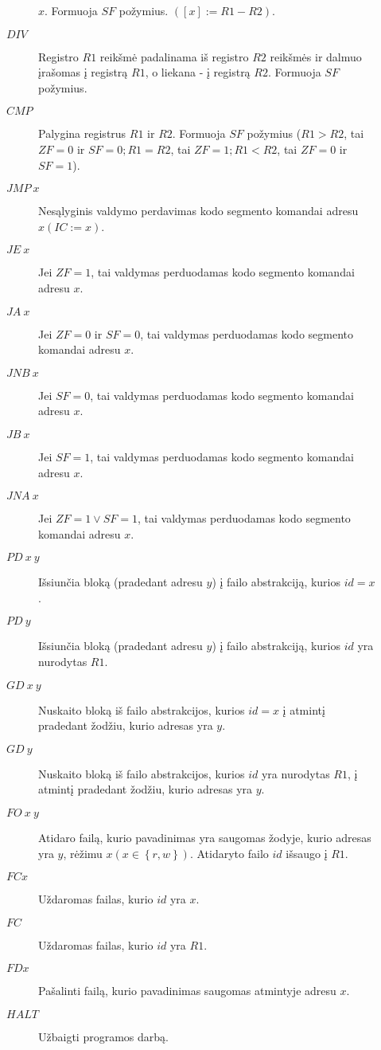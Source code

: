 \begin{description}
\begin{description}
          $x$. Formuoja $SF$ požymius. 
          $([x]:=R1-R2)$.
        \item[$DIV$] Registro $R1$ reikšmė padalinama iš registro $R2$ 
          reikšmės ir dalmuo įrašomas į registrą $R1$, o liekana - į 
          registrą $R2$. Formuoja $SF$ požymius.
        \item[$CMP$] Palygina registrus $R1$ ir $R2$. Formuoja $SF$ požymius
          ($R1>R2$, tai $ZF=0$ ir $SF=0; R1=R2$, tai $ZF=1; R1<R2$, 
          tai $ZF=0$ ir $SF=1$).
        \item[$JMP \: x$] Nesąlyginis valdymo perdavimas kodo segmento 
          komandai adresu  $x (IC:=x)$.
        \item[$JE \: x$] Jei $ZF=1$, tai valdymas perduodamas kodo segmento 
          komandai adresu $x$.
        \item[$JA \: x$] Jei $ZF=0$ ir $SF=0$, tai valdymas perduodamas kodo
          segmento komandai adresu $x$.
        \item[$JNB \: x$] Jei $SF=0$, tai valdymas perduodamas 
          kodo segmento komandai adresu $x$.
        \item[$JB \: x$] Jei $SF=1$, tai valdymas perduodamas kodo segmento
          komandai adresu $x$.
        \item[$JNA \: x$] Jei $ZF = 1 \lor SF=1$, tai valdymas perduodamas 
          kodo segmento komandai adresu $x$.
        \item[$PD \: x \: y$] Išsiunčia bloką (pradedant adresu 
          $y$) į failo abstrakciją, kurios $id = x$.
        \item[$PD \: y$] Išsiunčia bloką (pradedant adresu 
          $y$) į failo abstrakciją, kurios $id$ yra nurodytas $R1$.
        \item[$GD \: x \: y$] Nuskaito bloką iš failo abstrakcijos, kurios
          $id = x$ į atmintį pradedant žodžiu, kurio adresas yra $y$.
        \item[$GD \: y$] Nuskaito bloką iš failo abstrakcijos, kurios
          $id$ yra nurodytas $R1$, į atmintį pradedant žodžiu, kurio 
          adresas yra $y$.
        \item[$FO \: x \: y$] Atidaro failą, kurio pavadinimas yra saugomas
          žodyje, kurio adresas yra $y$, rėžimu 
          $x (x \in \left\{ r, w \right\})$. Atidaryto failo $id$ 
          išsaugo į $R1$.
        \item[$FC x$] Uždaromas failas, kurio $id$ yra $x$.
        \item[$FC$] Uždaromas failas, kurio $id$ yra $R1$.
        \item[$FD x$] Pašalinti failą, kurio pavadinimas saugomas atmintyje
          adresu $x$.
        \item[$HALT$] Užbaigti programos darbą.
    \end{description}
  \end{description} 
  
